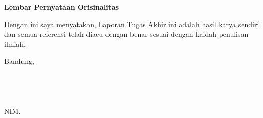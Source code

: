 \clearpage
\pagestyle{empty}

\begin{center}
    {\Large \bfseries Lembar Pernyataan Orisinalitas}
\end{center}


\vspace{15mm}

Dengan ini saya menyatakan, Laporan Tugas Akhir ini adalah hasil karya sendiri dan semua referensi telah diacu dengan benar sesuai dengan kaidah penulisan ilmiah.
\vspace{15mm}

Bandung, \thedate{} \yearsidang{} \\
\\
\\
\\
\underline{\theauthor}\\
NIM. \nim
\clearpage

